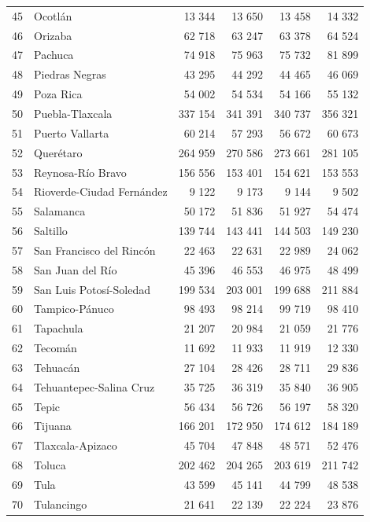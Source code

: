 \documentclass[]{article}
\begin{document}
\begin{table}[H]
\begin{tabular}{rlrrrr}
  45 & Ocotlán & 13 344 & 13 650 & 13 458 & 14 332 \\ 
  46 & Orizaba & 62 718 & 63 247 & 63 378 & 64 524 \\ 
  47 & Pachuca & 74 918 & 75 963 & 75 732 & 81 899 \\ 
  48 & Piedras Negras & 43 295 & 44 292 & 44 465 & 46 069 \\ 
  49 & Poza Rica & 54 002 & 54 534 & 54 166 & 55 132 \\ 
  50 & Puebla-Tlaxcala & 337 154 & 341 391 & 340 737 & 356 321 \\ 
  51 & Puerto Vallarta & 60 214 & 57 293 & 56 672 & 60 673 \\ 
  52 & Querétaro & 264 959 & 270 586 & 273 661 & 281 105 \\ 
  53 & Reynosa-Río Bravo & 156 556 & 153 401 & 154 621 & 153 553 \\ 
  54 & Rioverde-Ciudad Fernández & 9 122 & 9 173 & 9 144 & 9 502 \\ 
  55 & Salamanca & 50 172 & 51 836 & 51 927 & 54 474 \\ 
  56 & Saltillo & 139 744 & 143 441 & 144 503 & 149 230 \\ 
  57 & San Francisco del Rincón & 22 463 & 22 631 & 22 989 & 24 062 \\ 
  58 & San Juan del Río & 45 396 & 46 553 & 46 975 & 48 499 \\ 
  59 & San Luis Potosí-Soledad & 199 534 & 203 001 & 199 688 & 211 884 \\ 
  60 & Tampico-Pánuco & 98 493 & 98 214 & 99 719 & 98 410 \\ 
  61 & Tapachula & 21 207 & 20 984 & 21 059 & 21 776 \\ 
  62 & Tecomán & 11 692 & 11 933 & 11 919 & 12 330 \\ 
  63 & Tehuacán & 27 104 & 28 426 & 28 711 & 29 836 \\ 
  64 & Tehuantepec-Salina Cruz & 35 725 & 36 319 & 35 840 & 36 905 \\ 
  65 & Tepic & 56 434 & 56 726 & 56 197 & 58 320 \\ 
  66 & Tijuana & 166 201 & 172 950 & 174 612 & 184 189 \\ 
  67 & Tlaxcala-Apizaco & 45 704 & 47 848 & 48 571 & 52 476 \\ 
  68 & Toluca & 202 462 & 204 265 & 203 619 & 211 742 \\ 
  69 & Tula & 43 599 & 45 141 & 44 799 & 48 538 \\ 
  70 & Tulancingo & 21 641 & 22 139 & 22 224 & 23 876 \\ 

\end{tabular}
\end{table}
\end{document}
